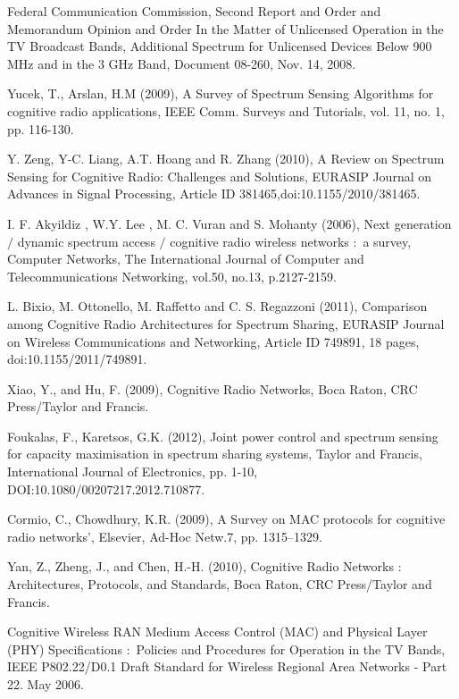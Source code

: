 \documentclass
[journal,11pt,draftclsnofoot,onecolumn,doublespace]{tETN2e}
\begin{document}
\begin{thebibliography}{9}
Federal Communication Commission, Second Report and Order and Memorandum Opinion and Order In the Matter of Unlicensed Operation in the TV Broadcast Bands, Additional Spectrum for Unlicensed Devices Below 900 MHz and in the 3 GHz Band, Document 08-260, Nov. 14, 2008.

Yucek, T., Arslan, H.M (2009), A Survey of Spectrum Sensing Algorithms for cognitive radio applications, IEEE Comm. Surveys and Tutorials, vol. 11, no. 1, pp. 116-130.

Y. Zeng, Y-C. Liang, A.T. Hoang and R. Zhang (2010), A Review on Spectrum Sensing for Cognitive Radio: Challenges and Solutions, EURASIP Journal on Advances in Signal Processing, Article ID 381465,doi:10.1155/2010/381465.   

I. F. Akyildiz , W.Y. Lee , M. C. Vuran and S. Mohanty (2006), Next generation $/$ dynamic spectrum access $/$ cognitive radio wireless networks $:$ a survey, Computer Networks, The International Journal of Computer and Telecommunications Networking, vol.50, no.13, p.2127-2159.

L. Bixio, M. Ottonello, M. Raffetto and C. S. Regazzoni (2011), Comparison among Cognitive Radio Architectures for Spectrum Sharing, EURASIP Journal on Wireless Communications and Networking, Article ID 749891, 18 pages, doi:10.1155/2011/749891.

Xiao, Y., and Hu, F. (2009), Cognitive Radio Networks, Boca Raton, CRC Press/Taylor and Francis. 

Foukalas, F., Karetsos, G.K. (2012), Joint power control and spectrum sensing for capacity maximisation in spectrum sharing systems, Taylor and Francis, International Journal of Electronics, pp. 1-10,
DOI:10.1080/00207217.2012.710877. 

Cormio, C., Chowdhury, K.R. (2009), A Survey on MAC protocols for cognitive radio networks’, Elsevier, Ad-Hoc Netw.7, pp. 1315–1329.

Yan, Z., Zheng, J., and Chen, H.-H. (2010), Cognitive Radio Networks $:$ Architectures, Protocols, and Standards, Boca Raton, CRC Press/Taylor and Francis.

Cognitive Wireless RAN Medium Access Control (MAC) and Physical Layer (PHY) Specifications $:$ Policies and Procedures for Operation in the TV Bands, IEEE P802.22/D0.1 Draft Standard for Wireless Regional Area Networks - Part 22. May 2006.


\end{thebibliography}
\end{document}
